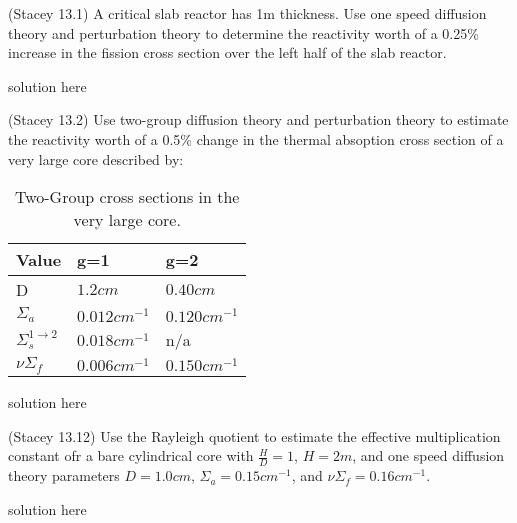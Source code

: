 \documentclass[11pt,answers]{exam}
\begin{document}
\begin{questions}

        \question[30] 
        (Stacey 13.1)
        A critical slab reactor has 1m thickness. 
        Use one speed diffusion theory and perturbation theory to 
        determine the reactivity worth of a 0.25\% increase in the fission 
        cross section over the left half of the slab reactor.
        \begin{solution}
                solution here
        \end{solution}

        
        \question[40] 
        (Stacey 13.2)
        Use two-group diffusion theory and perturbation theory to estimate the 
        reactivity worth of a 0.5\% change in the thermal absoption  cross 
        section of a very large core described by:
        
        \begin{table}[h!]
                \centering
                \begin{tabular}{lll}
                        \hline
                        \textbf{Value} & \textbf{g=1} & \textbf{g=2}\\
                        \hline
                        D & $1.2cm$ &  $0.40cm$\\
                        $\Sigma_a$ & $0.012cm^{-1}$ & $0.120cm^{-1}$ \\
                        $\Sigma_s^{1\rightarrow 2}$& $0.018cm^{-1}$ &  n/a \\
                        $\nu\Sigma_f$ & $0.006cm^{-1}$ & $0.150cm^{-1}$\\
                        \hline
                \end{tabular}
                \caption{Two-Group cross sections in the very large core.}
                \label{tab:prob2}
        \end{table}

        \begin{solution}
                solution here
        \end{solution}


        \question[30]
        (Stacey 13.12)
        Use the Rayleigh quotient to estimate the effective 
        multiplication constant ofr a bare cylindrical core with $\frac{H}{D} 
        =1$, $H=2m$, and one speed diffusion theory parameters $D=1.0cm$, 
        $\Sigma_a=0.15cm^{-1}$, and $\nu\Sigma_f=0.16cm^{-1}$. 
        \begin{solution}
                solution here
        \end{solution}


\end{questions}



%
%
\end{document}
